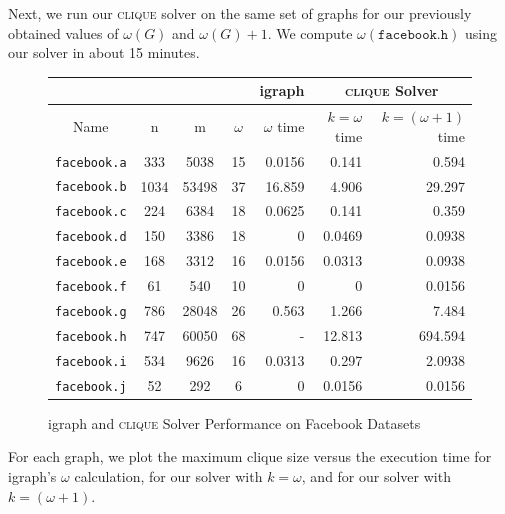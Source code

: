 \documentclass[]{article}
\newcommand{\clique}{\textsc{clique}}
\begin{document}
	Next, we run our \clique{} solver on the same set of graphs for our previously obtained values of $\omega(G)$ and $\omega(G) + 1$. We compute $\omega(\texttt{facebook.h})$ using our solver in about 15 minutes.
	\begin{figure}[H]
		\centering
		\caption{igraph and \clique{} Solver Performance on Facebook Datasets}
		\label{facebooktimetable}
		\begin{tabular}{|c|c|c|c|r|r|r|}
			\hline
			\multicolumn{4}{|l|}{}            & igraph    & \multicolumn{2}{c|}{\clique{} Solver} \\ \hline
			Name       & n    & m     & $\omega$ & $\omega$ time    & $k = \omega$ time        & $k = (\omega + 1)$ time      \\ \hline \hline
			\texttt{facebook.a} & 333  & 5038  & 15    & 0.0156  & 0.141      & 0.594           \\ \hline
			\texttt{facebook.b} & 1034 & 53498 & 37    & 16.859 & 4.906       & 29.297           \\ \hline
			\texttt{facebook.c} & 224  & 6384  & 18    & 0.0625    & 0.141      & 0.359          \\ \hline
			\texttt{facebook.d} & 150  & 3386  & 18    & 0         & 0.0469      & 0.0938           \\ \hline
			\texttt{facebook.e} & 168  & 3312  & 16    & 0.0156  & 0.0313       & 0.0938           \\ \hline
			\texttt{facebook.f} & 61   & 540   & 10    & 0         & 0             & 0.0156          \\ \hline
			\texttt{facebook.g} & 786  & 28048 & 26    & 0.563    & 1.266       & 7.484           \\ \hline
			\texttt{facebook.h} & 747  & 60050 & 68    & -         & 12.813       & 694.594           \\ \hline
			\texttt{facebook.i} & 534  & 9626  & 16    & 0.0313   & 0.297      & 2.0938           \\ \hline
			\texttt{facebook.j} & 52   & 292   & 6     & 0         & 0.0156      & 0.0156          \\ \hline
		\end{tabular}
	\end{figure}
	
	For each graph, we plot the maximum clique size versus the execution time for igraph's $\omega$ calculation, for our solver with $k = \omega$, and for our solver with $k = (\omega + 1)$.
	
\end{document}

